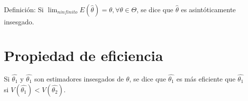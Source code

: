 \documentclass{article}
\begin{document}
Definición: Si $\lim_{n infinito} E(\hat{\theta})=\theta, \forall \theta \in \Theta$, se dice que $\hat{\theta}$ es asintóticamente insesgado.
\section{Propiedad de eficiencia}
Si $\hat{\theta_{1}}$ y $\hat{\theta_{1}}$ son estimadores insesgados de $\theta$, se dice que $\hat{\theta_{1}}$ es más eficiente que  $\hat{\theta_{1}}$ si $V(\hat{\theta_{1}}) < V(\hat{\theta_{2}})$.
\end{document}
